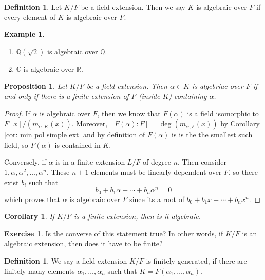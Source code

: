 \documentclass[11pt,a4paper]{report}
\theoremstyle{plain}
\newtheorem{corollary}[subsection]{Corollary}
\newtheorem{prop}[subsection]{Proposition}
\theoremstyle{definition}
\newtheorem{definition}[subsection]{Definition}
\newtheorem{exmp}[subsection]{Example}
\theoremstyle{definition}
\newtheorem{question}[subsection]{Exercise}
\newcommand{\RR}{\mathbb{R}}
\def\CC{\mathbb{C}}
\def\QQ{\mathbb{Q}}
\def \a{\alpha}
\begin{document}
	
	\begin{definition}
		Let $K/F$ be a field extension. Then we say $K$ is algebraic over $F$ if every element of $K$ is algebraic over $F$.
	\end{definition}
	
	\begin{exmp}
		\begin{enumerate}
			\item $\QQ(\sqrt{2})$ is algebraic over $\QQ$.
			\item $\CC$ is algebraic over $\RR$.
		\end{enumerate}
	\end{exmp}
	
	\begin{prop}
		\label{prop : alg_iff_fin}
		Let $K/F$ be a field extension. Then $\a \in K$ is algebriac over $F$ if and only if there is a finite extension of $F$ (inside $K$) containing $\a$.
	\end{prop}
	
	\begin{proof}
		If $\a$ is algebraic over $F$, then we know that $F(\a)$ is a field isomorphic to $F[x]/(m_{\a,K}(x))$. Moreover, $[F(\a):F]=\deg(m_{\a,F}(x))$ by Corollary \ref{cor: min pol simple ext} and by definition of $F(\a)$ is is the the smallest such field, so $F(\a)$ is contained in $K$.
		
		Conversely, if $\a$ is in a finite extension $L/F$ of degree $n$. Then consider $1,\a,\a^2,\dots,\a^n$. These $n+1$ elements must be linearly dependent over $F$, so there exist $b_i$ such that \[b_0+b_1\a+\cdots+b_n\a^n=0\] which proves that $\a$ is algebraic over $F$ since its a root of $b_0+b_1x+\cdots+b_n x^n$.
	\end{proof}
	
	\begin{corollary}\label{cor: fin ext is alg}
		If $K/F$ is a finite extension, then is it algebraic.
	\end{corollary}
	\begin{question}
		Is the converse of this statement true? In other words, if $K/F$ is an algebraic extension, then does it have to be finite?
	\end{question}
	
	
	\begin{definition}
		We say a field extension $K/F$ is finitely generated, if there are finitely many elements $\a_1,\dots,\a_n$ such that $K=F(\a_1,\dots,\a_n)$.
	\end{definition}
	
\end{document}
